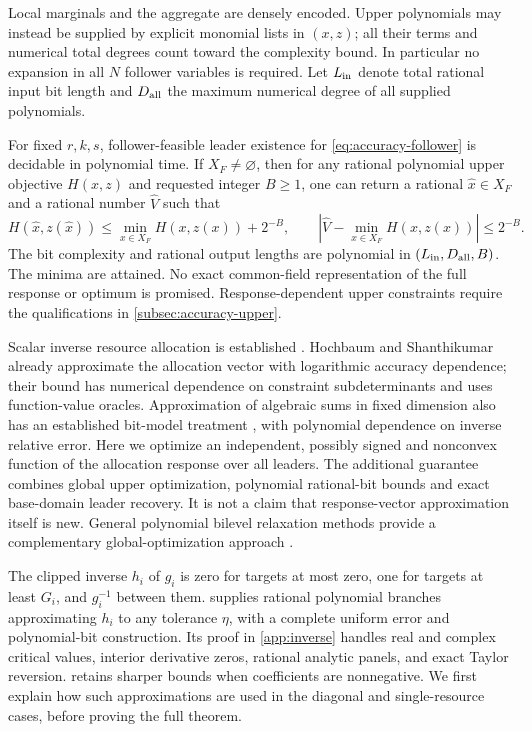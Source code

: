 Local marginals and the aggregate are densely encoded. Upper polynomials
may instead be supplied by explicit monomial lists in $(x,z)$; all their
terms and numerical total degrees count toward the complexity bound.
In particular no expansion in all $N$ follower variables is required.
Let $L_{\rm in}$ denote total rational input bit length and $D_{\rm all}$
the maximum numerical degree of all supplied polynomials.

\begin{theorem}\label{thm:accuracy-global}
For fixed $r,k,s$, follower-feasible leader existence for
\eqref{eq:accuracy-follower} is decidable in polynomial time. If
$X_F\ne\varnothing$, then for any rational polynomial upper objective
$H(x,z)$ and requested integer $B\ge1$, one can return a rational
$\widehat x\in X_F$ and a rational number $\widehat V$ such that
\[
 H(\widehat x,z(\widehat x))\le
       \min_{x\in X_F}H(x,z(x))+2^{-B},\qquad
 |\widehat V-\min_{x\in X_F}H(x,z(x))|\le2^{-B}.
\]
The bit complexity and rational output lengths are polynomial in
$(L_{\rm in},D_{\rm all},B)$. The minima are attained. No exact
common-field representation of the full response or optimum is promised.
Response-dependent upper constraints require the qualifications in
\cref{subsec:accuracy-upper}.
\end{theorem}

Scalar inverse resource allocation is established
\cite{PatrikssonStromberg2015}. Hochbaum and Shanthikumar
\cite[Sections 1.2--1.3 and Theorem 1.1]{HochbaumShanthikumar1990} already
approximate the allocation vector with logarithmic accuracy dependence;
their bound has numerical dependence on constraint subdeterminants and uses
function-value oracles. Approximation of algebraic sums in fixed dimension
also has an established bit-model treatment \cite{Vigneron2014}, with
polynomial dependence on inverse relative error. Here we optimize an
independent, possibly signed and nonconvex function of the allocation response
over all leaders. The additional guarantee combines global upper optimization,
polynomial rational-bit bounds and exact base-domain leader recovery. It is
not a claim that response-vector approximation itself is new. General polynomial bilevel relaxation methods provide a
complementary global-optimization approach \cite{JeyakumarEtAl2016}.

The clipped inverse $h_i$ of $g_i$ is zero for targets at most zero,
one for targets at least $G_i$, and $g_i^{-1}$ between them.
 supplies rational polynomial branches
approximating $h_i$ to any tolerance $\eta$, with a complete uniform
error and polynomial-bit construction. Its proof in \cref{app:inverse}
handles real and complex critical values, interior derivative zeros,
rational analytic panels, and exact Taylor reversion.
 retains sharper bounds when coefficients
are nonnegative. We first explain how such approximations are used in
the diagonal and single-resource cases, before proving the full theorem.

